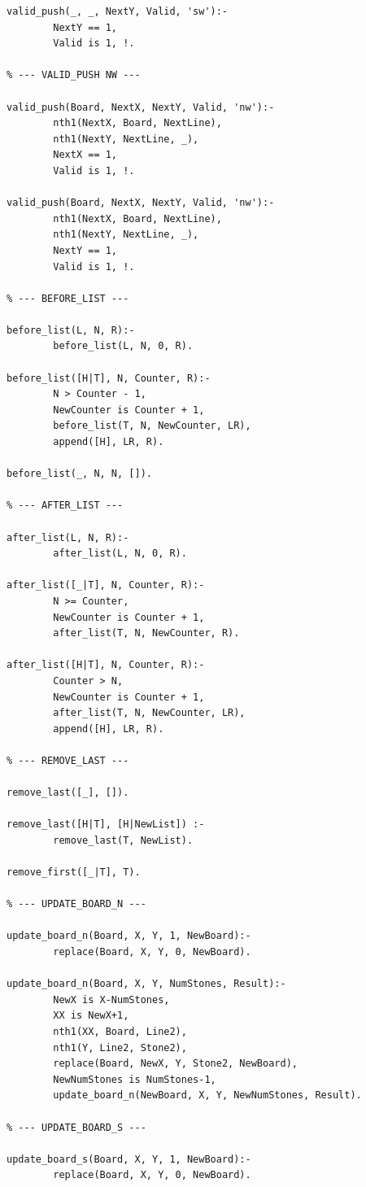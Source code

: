 \documentclass[a4paper]{article}
\begin{document}
\begin{lstlisting}
valid_push(_, _, NextY, Valid, 'sw'):- 
        NextY == 1,
        Valid is 1, !.

% --- VALID_PUSH NW ---

valid_push(Board, NextX, NextY, Valid, 'nw'):- 
        nth1(NextX, Board, NextLine),
        nth1(NextY, NextLine, _),
        NextX == 1,
        Valid is 1, !.

valid_push(Board, NextX, NextY, Valid, 'nw'):- 
        nth1(NextX, Board, NextLine),
        nth1(NextY, NextLine, _),
        NextY == 1,
        Valid is 1, !.

% --- BEFORE_LIST ---

before_list(L, N, R):- 
        before_list(L, N, 0, R).

before_list([H|T], N, Counter, R):- 
        N > Counter - 1,
        NewCounter is Counter + 1,
        before_list(T, N, NewCounter, LR),
        append([H], LR, R).

before_list(_, N, N, []).

% --- AFTER_LIST ---

after_list(L, N, R):- 
        after_list(L, N, 0, R).

after_list([_|T], N, Counter, R):- 
        N >= Counter,
        NewCounter is Counter + 1,
        after_list(T, N, NewCounter, R).

after_list([H|T], N, Counter, R):- 
        Counter > N,
        NewCounter is Counter + 1,
        after_list(T, N, NewCounter, LR),
        append([H], LR, R).

% --- REMOVE_LAST ---

remove_last([_], []).

remove_last([H|T], [H|NewList]) :- 
        remove_last(T, NewList).

remove_first([_|T], T).

% --- UPDATE_BOARD_N ---

update_board_n(Board, X, Y, 1, NewBoard):- 
        replace(Board, X, Y, 0, NewBoard).

update_board_n(Board, X, Y, NumStones, Result):- 
        NewX is X-NumStones,
        XX is NewX+1,
        nth1(XX, Board, Line2),
        nth1(Y, Line2, Stone2),
        replace(Board, NewX, Y, Stone2, NewBoard), 
        NewNumStones is NumStones-1,
        update_board_n(NewBoard, X, Y, NewNumStones, Result).

% --- UPDATE_BOARD_S ---

update_board_s(Board, X, Y, 1, NewBoard):- 
        replace(Board, X, Y, 0, NewBoard).


\end{lstlisting}
\end{document}
